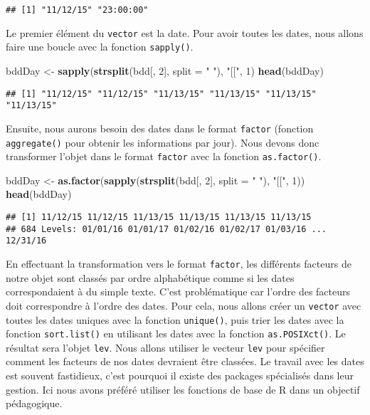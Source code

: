 \documentclass[]{book}
\newenvironment{Shaded}{\begin{snugshade}}{\end{snugshade}}
\newcommand{\KeywordTok}[1]{\textcolor[rgb]{0.13,0.29,0.53}{\textbf{#1}}}
\newcommand{\DataTypeTok}[1]{\textcolor[rgb]{0.13,0.29,0.53}{#1}}
\newcommand{\DecValTok}[1]{\textcolor[rgb]{0.00,0.00,0.81}{#1}}
\newcommand{\StringTok}[1]{\textcolor[rgb]{0.31,0.60,0.02}{#1}}
\newcommand{\NormalTok}[1]{#1}
\theoremstyle{definition}
\theoremstyle{definition}
\theoremstyle{definition}
\theoremstyle{remark}
\begin{document}
\begin{verbatim}
## [1] "11/12/15" "23:00:00"
\end{verbatim}

Le premier élément du \texttt{vector} est la date. Pour avoir toutes les
dates, nous allons faire une boucle avec la fonction \texttt{sapply()}.

\begin{Shaded}
\begin{Highlighting}[]
\NormalTok{bddDay <-}\StringTok{ }\KeywordTok{sapply}\NormalTok{(}\KeywordTok{strsplit}\NormalTok{(bdd[, }\DecValTok{2}\NormalTok{], }\DataTypeTok{split =} \StringTok{" "}\NormalTok{), }\StringTok{"[["}\NormalTok{, }\DecValTok{1}\NormalTok{)}
\KeywordTok{head}\NormalTok{(bddDay)}
\end{Highlighting}
\end{Shaded}

\begin{verbatim}
## [1] "11/12/15" "11/12/15" "11/13/15" "11/13/15" "11/13/15" "11/13/15"
\end{verbatim}

Ensuite, nous aurons besoin des dates dans le format \texttt{factor}
(fonction \texttt{aggregate()} pour obtenir les informations par jour).
Nous devons donc transformer l'objet dans le format \texttt{factor} avec
la fonction \texttt{as.factor()}.

\begin{Shaded}
\begin{Highlighting}[]
\NormalTok{bddDay <-}\StringTok{ }\KeywordTok{as.factor}\NormalTok{(}\KeywordTok{sapply}\NormalTok{(}\KeywordTok{strsplit}\NormalTok{(bdd[, }\DecValTok{2}\NormalTok{], }\DataTypeTok{split =} \StringTok{" "}\NormalTok{), }\StringTok{"[["}\NormalTok{, }\DecValTok{1}\NormalTok{))}
\KeywordTok{head}\NormalTok{(bddDay)}
\end{Highlighting}
\end{Shaded}

\begin{verbatim}
## [1] 11/12/15 11/12/15 11/13/15 11/13/15 11/13/15 11/13/15
## 684 Levels: 01/01/16 01/01/17 01/02/16 01/02/17 01/03/16 ... 12/31/16
\end{verbatim}

En effectuant la transformation vers le format \texttt{factor}, les
différents facteurs de notre objet sont classés par ordre alphabétique
comme si les dates correspondaient à du simple texte. C'est
problématique car l'ordre des facteurs doit correspondre à l'ordre des
dates. Pour cela, nous allons créer un \texttt{vector} avec toutes les
dates uniques avec la fonction \texttt{unique()}, puis trier les dates
avec la fonction \texttt{sort.list()} en utilisant les dates avec la
fonction \texttt{as.POSIXct()}. Le résultat sera l'objet \texttt{lev}.
Nous allons utiliser le vecteur \texttt{lev} pour spécifier comment les
facteurs de nos dates devraient être classées. Le travail avec les dates
est souvent fastidieux, c'est pourquoi il existe des packages
spécialisés dans leur gestion. Ici nous avons préféré utiliser les
fonctions de base de R dans un objectif pédagogique.
\end{document}
